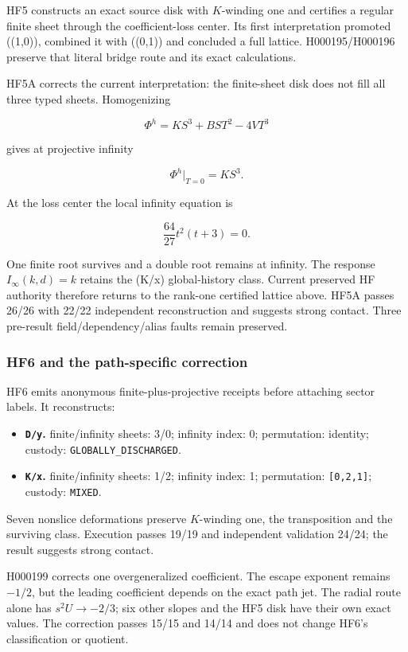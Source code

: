 HF5 constructs an exact source disk with \(K\)-winding one and certifies
a regular finite sheet through the coefficient-loss center. Its first
interpretation promoted ((1,0)), combined it with ((0,1)) and concluded
a full lattice. H000195/H000196 preserve that literal bridge route and
its exact calculations.

HF5A corrects the current interpretation: the finite-sheet disk does not
fill all three typed sheets. Homogenizing

\[
\Phi^h=KS^3+BST^2-4VT^3
\]

gives at projective infinity

\[
\Phi^h|_{T=0}=KS^3.
\]

At the loss center the local infinity equation is

\[
\frac{64}{27}t^2(t+3)=0.
\]

One finite root survives and a double root remains at infinity. The
response \(I_\infty(k,d)=k\) retains the (K/x) global-history class.
Current preserved HF authority therefore returns to the rank-one
certified lattice above. HF5A passes 26/26 with 22/22 independent
reconstruction and suggests strong contact. Three pre-result
field/dependency/alias faults remain preserved.

\subsubsection{HF6 and the path-specific
correction}\label{viii-ch11-hf6-and-the-path-specific-correction}

HF6 emits anonymous finite-plus-projective receipts before attaching
sector labels. It reconstructs:

\begin{itemize}
\tightlist
\item
  \textbf{\texttt{D/y}.} finite/infinity sheets: 3/0; infinity index: 0;
  permutation: identity; custody: \texttt{GLOBALLY\_DISCHARGED}.
\item
  \textbf{\texttt{K/x}.} finite/infinity sheets: 1/2; infinity index: 1;
  permutation: \texttt{{[}0,2,1{]}}; custody: \texttt{MIXED}.
\end{itemize}

Seven nonslice deformations preserve \(K\)-winding one, the
transposition and the surviving class. Execution passes 19/19 and
independent validation 24/24; the result suggests strong contact.

H000199 corrects one overgeneralized coefficient. The escape exponent
remains \(-1/2\), but the leading coefficient depends on the exact path
jet. The radial route alone has \(s^2U\to-2/3\); six other slopes and
the HF5 disk have their own exact values. The correction passes 15/15
and 14/14 and does not change HF6's classification or quotient.

